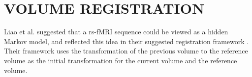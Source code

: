 

\section{VOLUME REGISTRATION}

Liao et al. suggested that a rs-fMRI sequence could be viewed as a hidden Markov model, and reflected this idea in their suggested registration framework \cite{Liao2016}. Their framework uses the transformation of the previous volume to the reference volume as the initial transformation for the current volume and the reference volume. 



%
%
%
%
%
